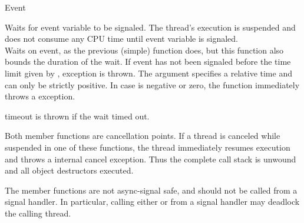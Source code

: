 \begin{classpage}{Event}
\begin{mandescription}
  Waits for 
  event variable to be signaled. The thread's execution is
  suspended and does not consume any CPU time until 
  event variable is signaled.\\

  Waits on  event, as the previous (simple) 
  function does, but this function also bounds the duration of the
  wait. If  event has not been signaled before the time
  limit given by ,
  exception  is thrown. The 
  argument specifies a relative time and can only be strictly
  positive. In case  is negative or zero, the
  function immediately throws a  exception.
  \begin{exception}
    \item[timeout] is thrown if the wait timed out.
  \end{exception}
\end{mandescription}

Both  member functions are cancellation
points. If a thread is canceled while suspended in one of these
functions, the thread immediately resumes execution and throws a
\lisle internal cancel exception. Thus the complete call stack is
unwound and all object destructors executed.

The  member functions are not async-signal safe, and
should not be called from a signal handler. In particular, calling
either  or 
from a signal handler may deadlock the calling thread.

\end{classpage}
